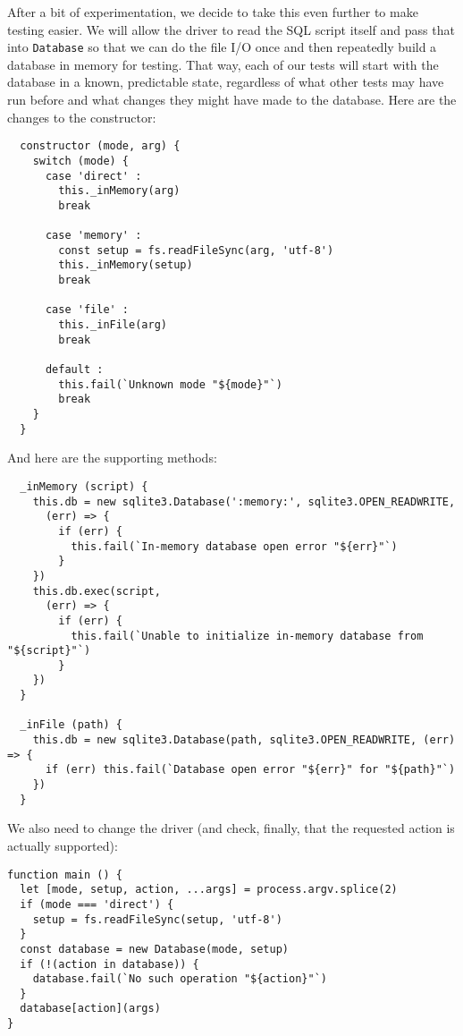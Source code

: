 After a bit of experimentation,
we decide to take this even further to make testing easier.
We will allow the driver to read the SQL script itself and pass that into \texttt{Database}
so that we can do the file I/O once and then repeatedly build a database in memory for testing.
That way,
each of our tests will start with the database in a known, predictable state,
regardless of what other tests may have run before
and what changes they might have made to the database.
Here are the changes to the constructor:

\begin{verbatim}
  constructor (mode, arg) {
    switch (mode) {
      case 'direct' :
        this._inMemory(arg)
        break

      case 'memory' :
        const setup = fs.readFileSync(arg, 'utf-8')
        this._inMemory(setup)
        break

      case 'file' :
        this._inFile(arg)
        break

      default :
        this.fail(`Unknown mode "${mode}"`)
        break
    }
  }
\end{verbatim}

And here are the supporting methods:

\begin{verbatim}
  _inMemory (script) {
    this.db = new sqlite3.Database(':memory:', sqlite3.OPEN_READWRITE,
      (err) => {
        if (err) {
          this.fail(`In-memory database open error "${err}"`)
        }
    })
    this.db.exec(script,
      (err) => {
        if (err) {
          this.fail(`Unable to initialize in-memory database from "${script}"`)
        }
    })
  }

  _inFile (path) {
    this.db = new sqlite3.Database(path, sqlite3.OPEN_READWRITE, (err) => {
      if (err) this.fail(`Database open error "${err}" for "${path}"`)
    })
  }
\end{verbatim}

We also need to change the driver
(and check, finally, that the requested action is actually supported):

\begin{verbatim}
function main () {
  let [mode, setup, action, ...args] = process.argv.splice(2)
  if (mode === 'direct') {
    setup = fs.readFileSync(setup, 'utf-8')
  }
  const database = new Database(mode, setup)
  if (!(action in database)) {
    database.fail(`No such operation "${action}"`)
  }
  database[action](args)
}
\end{verbatim}

